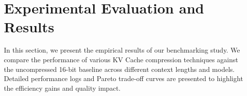 \section{Experimental Evaluation and Results}
\label{sec:results}

In this section, we present the empirical results of our benchmarking study. We compare the performance of various KV Cache compression techniques against the uncompressed 16-bit baseline across different context lengths and models. Detailed performance logs and Pareto trade-off curves are presented to highlight the efficiency gains and quality impact.
